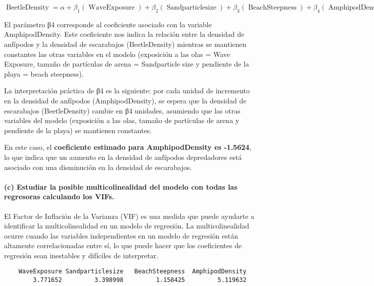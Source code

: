\documentclass[
]{article}
\begin{document}
\begin{equation}
\operatorname{BeetleDensity} = \alpha + \beta_{1}(\operatorname{WaveExposure}) + \beta_{2}(\operatorname{Sandparticlesize}) + \beta_{3}(\operatorname{BeachSteepness}) + \beta_{4}(\operatorname{AmphipodDensity}) + \epsilon
\end{equation}

El parámetro β4 corresponde al coeficiente asociado con la variable
AmphipodDensity. Este coeficiente nos indica la relación entre la
densidad de anfípodos y la densidad de escarabajos (BeetleDensity)
mientras se mantienen constantes las otras variables en el modelo
(exposición a las olas = Wave Exposure, tamaño de partículas de arena =
Sandparticle size y pendiente de la playa = beach steepness).

La interpretación práctica de β4 es la siguiente: por cada unidad de
incremento en la densidad de anfípodos (AmphipodDensity), se espera que
la densidad de escarabajos (BeetleDensity) cambie en β4 unidades,
asumiendo que las otras variables del modelo (exposición a las olas,
tamaño de partículas de arena y pendiente de la playa) se mantienen
constantes.

En este caso, el \textbf{coeficiente estimado para AmphipodDensity es
-1.5624}, lo que indica que un aumento en la densidad de anfípodos
depredadores está asociado con una disminución en la densidad de
escarabajos.

\hypertarget{c-estudiar-la-posible-multicolinealidad-del-modelo-con-todas-las-regresoras-calculando-los-vifs.}{%
\paragraph{\texorpdfstring{\textbf{(c) Estudiar la posible
multicolinealidad del modelo con todas las regresoras calculando los
VIFs.}}{(c) Estudiar la posible multicolinealidad del modelo con todas las regresoras calculando los VIFs.}}\label{c-estudiar-la-posible-multicolinealidad-del-modelo-con-todas-las-regresoras-calculando-los-vifs.}}

El Factor de Inflación de la Varianza (VIF) es una medida que puede
ayudarte a identificar la multicolinealidad en un modelo de regresión.
La multicolinealidad ocurre cuando las variables independientes en un
modelo de regresión están altamente correlacionadas entre sí, lo que
puede hacer que los coeficientes de regresión sean inestables y
difíciles de interpretar.

\begin{verbatim}
    WaveExposure Sandparticlesize   BeachSteepness  AmphipodDensity 
        3.771652         3.398998         1.158425         5.119632 
\end{verbatim}
\end{document}
